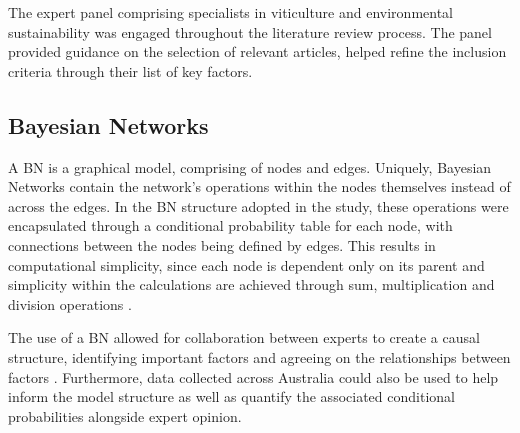 The expert panel comprising specialists in viticulture and environmental sustainability was engaged throughout the literature review process. The panel provided guidance on the selection of relevant articles, helped refine the inclusion criteria through their list of key factors.

\subsection{Bayesian Networks}

A BN is a graphical model, comprising of nodes and edges. Uniquely, Bayesian Networks contain the network's operations within the nodes themselves instead of across the edges. In the BN structure adopted in the study, these operations were encapsulated through a conditional probability table for each node, with connections between the nodes being defined by edges. This results in computational simplicity, since each node is dependent only on its parent and simplicity within the calculations are achieved through sum, multiplication and division operations
\citep{korbBayesianArtificialIntelligence2011}.

The use of a BN allowed for collaboration between experts to create a causal structure, identifying important factors and agreeing on the relationships between factors
\citep{pourretBayesianNetworksPractical2008}. Furthermore, data collected across Australia could also be used to help inform the model structure as well as quantify the associated conditional probabilities alongside expert opinion.

